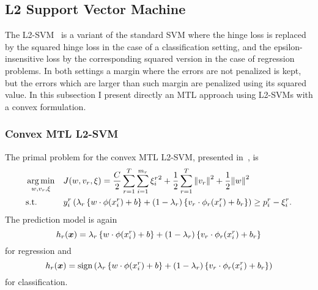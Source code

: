 
\subsection{L2 Support Vector Machine}
The L2-SVM~\cite{Burges98} is a variant of the standard SVM where the hinge loss is replaced by the squared hinge loss in the case of a classification setting, and the epsilon-insensitive loss by the corresponding squared version in the case of regression problems. In both settings a margin where the errors are not penalized is kept, but the errors which are larger than such margin are penalized using its squared value.
In this subsection I present directly an MTL approach using L2-SVMs with a convex formulation.

\subsubsection{{Convex} MTL L2-SVM}
The primal problem for the convex MTL L2-SVM, presented in~\cite{RuizAD21}, is
\begin{equation}\label{eq:svmmtl_primal_convex_l2}
    \begin{aligned}
    & \argmin_{w, {v}_r, \xi}
    & & {J({w}, {v}_r, \xi) = \frac{C}{2} \sum_{r= 1}^T \sum_{i=1}^{m_r} {\xi_{i}^r}^2 + \frac{1}{2} \sum_{r= 1}^T{\norm{{v}_r}^2} + \frac{1}{2} {\norm{{w}}}^2} \\
    & \text{s.t.}
    & & y_{i}^r \left(\lambda_r \left\lbrace {w} \cdot \phi(x_{i}^r) + b  \right\rbrace + (1 - \lambda_r) \left\lbrace {v}_r \cdot \phi_r(x_{i}^r) + b_r \right\rbrace  \right) \geq p_{i}^r - \xi_{i}^r .  \\
    \end{aligned}
\end{equation}
The prediction model is again
\begin{equation}
    \nonumber
    h_r(\bm{x}) = \lambda_r \left\lbrace {w} \cdot \phi(x_{i}^r) + b  \right\rbrace + (1 - \lambda_r) \left\lbrace {v}_r \cdot \phi_r(x_{i}^r) + b_r \right\rbrace
\end{equation}
for regression and 
\begin{equation}
    \nonumber
    h_r(\bm{x}) = \operatorname{sign}{ \left(\lambda_r \left\lbrace {w} \cdot \phi(x_{i}^r) + b  \right\rbrace + (1 - \lambda_r) \left\lbrace {v}_r \cdot \phi_r(x_{i}^r) + b_r \right\rbrace \right)}
\end{equation}
for classification.
%

